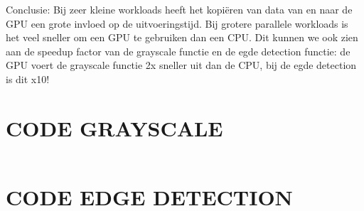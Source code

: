 \documentclass[11pt,twoside,a4paper]{article}
\begin{document}
Conclusie: Bij zeer kleine workloads heeft het kopi\"eren van data van en naar de GPU een grote invloed op de uitvoeringstijd. Bij grotere parallele workloads is het veel sneller om een GPU te gebruiken dan een CPU. Dit kunnen we ook zien aan de speedup factor van de grayscale functie en de egde detection functie: de GPU voert de grayscale functie 2x sneller uit dan de CPU, bij de egde detection is dit x10! 


\newpage
\appendix


\section{CODE GRAYSCALE}\label{code_grayscale}
\inputminted[linenos=true, breaklines=true]{cuda}{main.cu}
\clearpage
\section{CODE EDGE DETECTION}\label{code_edge_detection}
\inputminted[linenos=true, breaklines=true]{cuda}{edge.cu}

\clearpage



\end{document}

